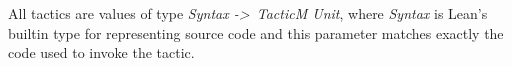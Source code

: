 All tactics are values of type \textit{Syntax -\textgreater\ TacticM Unit}, where \textit{Syntax} is Lean's builtin type for representing source code and this parameter matches exactly the code used to invoke the tactic.

